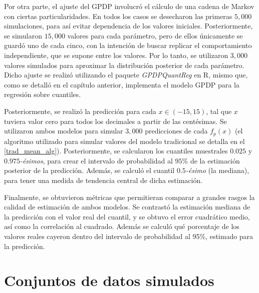 Por otra parte, el ajuste del GPDP involucr\'o el c\'alculo de una cadena de Markov con ciertas particularidades. En todos los casos se desecharon las primeras $5,000$ simulaciones, para as\'i evitar dependencia de los valores iniciales. Posteriormente, se simularon $15,000$ valores para cada par\'ametro, pero de ellos \'unicamente se guard\'o uno de cada cinco, con la intenci\'on de buscar replicar el comportamiento independiente, que se supone entre los valores. Por lo tanto, se utilizaron $3,000$ valores simulados para aproximar la distribuci\'on posterior de cada par\'ametro. Dicho ajuste se realiz\'o utilizando el paquete \textit{GPDPQuantReg} en R, mismo que, como se detalló en el cap\'itulo anterior, implementa el modelo GPDP para la regresi\'on sobre cuantiles.



Posteriormente, se realiz\'o la predicci\'on para cada $x \in (-15,15)$, tal que $x$ tuviera valor cero para todos los decimales a partir de las cent\'esimas. Se utilizaron ambos modelos para simular $3,000$ predicciones de cada $f_p(x)$ (el algoritmo utilizado para simular valores del modelo tradicional se detalla en el \autoref{trad_mean_alg}). Posteriormente, se calcularon los cuantiles  muestrales $0.025$ y $0.975$\textit{-\'esimos}, para crear el intervalo de probabilidad al $95\%$ de la estimaci\'on posterior de la predicci\'on. Adem\'as, se calcul\'o el cuantil $0.5$\textit{-\'esimo} (la mediana), para tener una medida de tendencia central de dicha estimaci\'on. 

Finalmente, se obtuvieron m\'etricas que permitieran comparar a grandes rasgos la calidad de estimaci\'on de ambos modelos. Se contrast\'o la estimaci\'on mediana de la predicci\'on con el valor real del cuantil, y se obtuvo el error cuadr\'atico medio, as\'i como la correlaci\'on al cuadrado. Adem\'as se calcul\'o qu\'e porcentaje de los valores reales cayeron dentro del intervalo de probabilidad al 95\%, estimado para la predicci\'on.

\section{Conjuntos de datos simulados}

